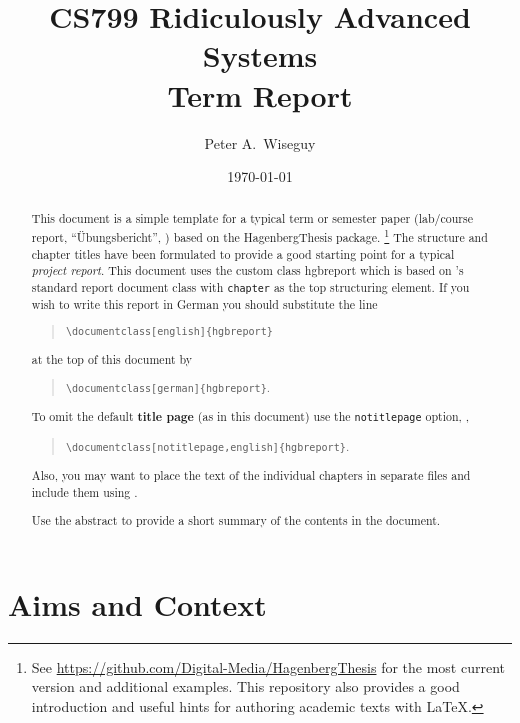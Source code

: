\documentclass[notitlepage,english]{hgbreport}
\author{Peter A.\ Wiseguy}										%
\title{CS799 Ridiculously Advanced Systems\\	%
			Term Report}	%
\date{\today}
\begin{document}

\maketitle

\begin{abstract}\noindent
This document is a simple template for a typical term or semester paper (lab/course report, 
``Übungsbericht'', \etc) based on the \textsf{HagenbergThesis} \latex package.%
\footnote{See \url{https://github.com/Digital-Media/HagenbergThesis} for the most current version
and additional examples.
This repository also provides a good introduction and useful hints for authoring academic texts with LaTeX.}
The structure and chapter titles have been formulated to provide a good starting point
for a typical \emph{project report}.
This document uses the custom class \textsf{hgbreport} which is based on \latex's standard \textsf{report} 
document class with \texttt{chapter} as the top structuring element. 
If you wish to write this report in German you should substitute the line
\begin{quote}
	\verb!\documentclass[english]{hgbreport}! 
\end{quote}
at the top of this document by
\begin{quote}
	\verb!\documentclass[german]{hgbreport}!.
\end{quote}
To omit the default \textbf{title page} (as in this document) use the \texttt{notitlepage} option, \eg,
\begin{quote}
	\verb!\documentclass[notitlepage,english]{hgbreport}!.
\end{quote}
Also, you may want to place the text of the individual chapters in separate files and 
include them using \verb!!.

\bigskip
\noindent
Use the abstract to provide a short summary of the contents in the document.
\end{abstract}


\tableofcontents



\chapter{Aims and Context}
\end{document}

